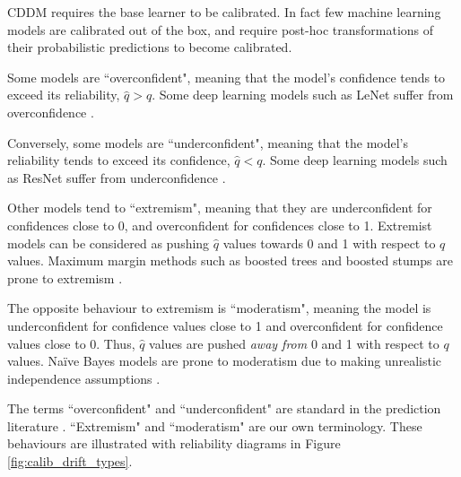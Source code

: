 CDDM requires the base learner to be calibrated. In fact few machine learning models are calibrated out of the box, and require post-hoc transformations of  their probabilistic predictions to become calibrated.

Some models are ``overconfident", meaning that the model's confidence tends to exceed its reliability, $\hat{q}>q$. Some deep learning models such as LeNet \cite{lenet} suffer from overconfidence \cite{nn_calibration}.

Conversely, some models are ``underconfident", meaning that the model's reliability tends to exceed its confidence, $\hat{q}<q$. Some deep learning models such as ResNet \cite{resnet} suffer from underconfidence \cite{nn_calibration}.  

Other models tend to ``extremism", meaning that they are underconfident for confidences close to 0, and overconfident for confidences close to 1.  Extremist models can be considered as pushing $\hat{q}$ values towards 0 and 1 with respect to $q$ values. Maximum margin methods such as boosted trees and boosted stumps are prone to extremism \cite{calibrating}.

The opposite behaviour to extremism is ``moderatism", meaning the model is underconfident for confidence values close to 1 and overconfident for confidence values close to 0. Thus, $\hat{q}$ values are pushed {\it away from} 0 and 1 with respect to $q$ values. Na\"{i}ve Bayes models are prone to moderatism due to making unrealistic independence assumptions \cite{calibrating}. 

The terms ``overconfident" and ``underconfident" are standard in the prediction literature \cite{superforecasting}. ``Extremism" and ``moderatism" are our own terminology. These behaviours are illustrated with reliability diagrams in Figure \ref{fig:calib_drift_types}. 

